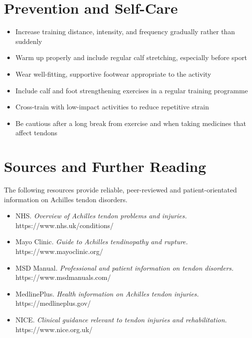 \section*{Prevention and Self-Care}
\begin{itemize}
    \item Increase training distance, intensity, and frequency gradually rather than suddenly
    \item Warm up properly and include regular calf stretching, especially before sport
    \item Wear well-fitting, supportive footwear appropriate to the activity
    \item Include calf and foot strengthening exercises in a regular training programme
    \item Cross-train with low-impact activities to reduce repetitive strain
    \item Be cautious after a long break from exercise and when taking medicines that affect tendons
\end{itemize}

\section*{Sources and Further Reading}
The following resources provide reliable, peer-reviewed and patient-orientated information on Achilles tendon disorders.

\begin{itemize}
    \item NHS. \textit{Overview of Achilles tendon problems and injuries.} https://www.nhs.uk/conditions/
    \item Mayo Clinic. \textit{Guide to Achilles tendinopathy and rupture.} https://www.mayoclinic.org/
    \item MSD Manual. \textit{Professional and patient information on tendon disorders.} https://www.msdmanuals.com/
    \item MedlinePlus. \textit{Health information on Achilles tendon injuries.} https://medlineplus.gov/
    \item NICE. \textit{Clinical guidance relevant to tendon injuries and rehabilitation.} https://www.nice.org.uk/
\end{itemize}
